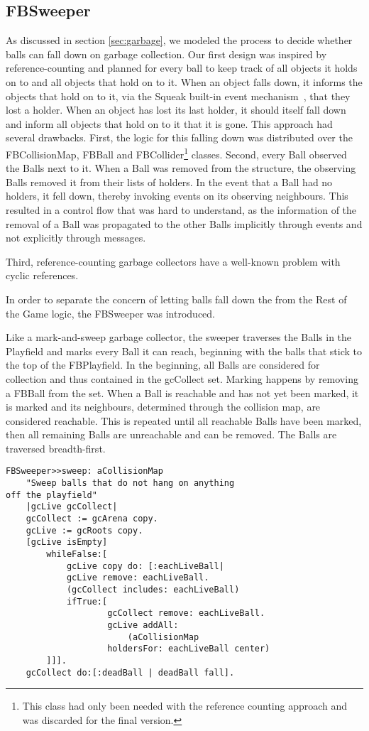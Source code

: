 \subsection{FBSweeper}
As discussed in section \ref{sec:garbage}, we modeled the process to decide whether balls can fall down on garbage collection. Our first design was inspired by reference-counting and planned for every ball to keep track of all objects it holds on to and all objects that hold on to it. When an object falls down, it informs the objects that hold on to it, via the Squeak built-in event mechanism~\cite{website:squeakwikiObserver}, that they lost a holder. When an object has lost its last holder, it should itself fall down and inform all objects that hold on to it that it is gone.
This approach had several drawbacks. First, the logic for this falling down was distributed over the FBCollisionMap, FBBall and FBCollider\footnote{This class had only been needed with the reference counting approach and was discarded for the final version.} classes.
Second, every Ball observed the Balls next to it. When a Ball was removed from the structure, the observing Balls removed it from their lists of holders. In the event that a Ball had no holders, it fell down, thereby invoking events on its observing neighbours.
This resulted in a control flow that was hard to understand, as the information of the removal of a Ball was propagated to the other Balls implicitly through events and not explicitly through messages.

Third, reference-counting garbage collectors have a well-known problem with cyclic references.

In order to separate the concern of letting balls fall down the from the Rest of the Game logic, the FBSweeper was introduced.

Like a mark-and-sweep garbage collector, the sweeper traverses the Balls in the Playfield and marks every Ball it can reach, beginning with the balls that stick to the top of the FBPlayfield.  In the beginning, all Balls are considered for collection and thus contained in the gcCollect set. Marking happens by removing a FBBall from the set. When a Ball is reachable and has not yet been marked, it is marked and its neighbours, determined through the collision map, are considered reachable. This is repeated until all reachable Balls have been marked, then all remaining Balls are unreachable and can be removed.
The Balls are traversed breadth-first.

\begin{lstlisting}[language=Smalltalk, label=lst:sweep, caption= mark-and-sweep ball collector, float]
FBSweeper>>sweep: aCollisionMap
    "Sweep balls that do not hang on anything 
off the playfield"
    |gcLive gcCollect|
    gcCollect := gcArena copy.
    gcLive := gcRoots copy.
    [gcLive isEmpty] 
        whileFalse:[
            gcLive copy do: [:eachLiveBall|
            gcLive remove: eachLiveBall.
            (gcCollect includes: eachLiveBall) 
	        ifTrue:[
                    gcCollect remove: eachLiveBall.
                    gcLive addAll:
                        (aCollisionMap 
		            holdersFor: eachLiveBall center)
        ]]].
    gcCollect do:[:deadBall | deadBall fall].
\end{lstlisting}

